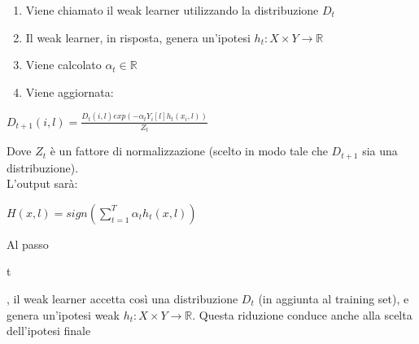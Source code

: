 \begin{enumerate}
 \item Viene chiamato il weak learner utilizzando la distribuzione \begin{math}
                                                             D_t
                                                            \end{math}
 \item Il weak learner, in risposta, genera un'ipotesi \begin{math}
                               h_t : X \times Y \rightarrow \mathbb{R}
                              \end{math}
 \item Viene calcolato \begin{math}
                \alpha_t \in \mathbb{R}
               \end{math}
 \item Viene aggiornata:

\end{enumerate}
\begin{center}
 \begin{math}
  D_{t+1}(i,l) = \frac{D_t(i,l)exp(-\alpha_t Y_i\left[l\right] h_t (x_i,l))}{Z_t}
 \end{math}
\end{center}
Dove \begin{math}
      Z_t
     \end{math} \`e un fattore di normalizzazione (scelto in modo tale che 
\begin{math}
 D_{t+1}
\end{math} sia una distribuzione).\\
L'output sar\`a:
\begin{center}
 \begin{math}
  H(x,l) = sign ( \sum_{t=1}^T \alpha_t h_t (x,l))
 \end{math}

\end{center}
Al passo \begin{it}t\end{it}, il weak learner accetta cos\`i una distribuzione \begin{math}
                                                                               D_t
                                                                              \end{math} (in aggiunta al 
training set), e genera un'ipotesi weak \begin{math}
                                         h_t :X \times Y \rightarrow \mathbb{R}
                                        \end{math}. Questa riduzione conduce anche alla scelta dell'ipotesi finale 
